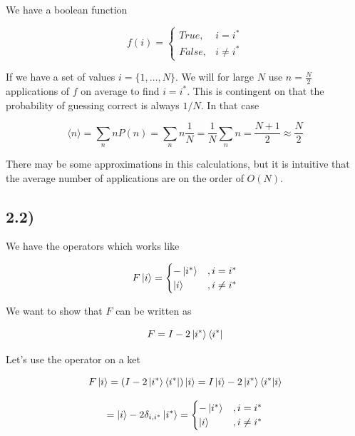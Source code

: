 \documentclass[a4paper,norsk, 10pt]{article}
\begin{document}
We have a boolean function

\begin{equation}
f(i)=
\begin{cases}
True, & i = i^* \\
False, & i \neq i^*
\end{cases}
\end{equation}

If we have a set of values $i = \{1,\ldots, N\}$. We will for large $N$ use $n = \frac{N}{2}$ applications of $f$ on average to find $i = i^*$. This is contingent on that the probability of guessing correct is always $1/N$. In that case

\begin{equation}
\langle n \rangle = \sum_n nP(n) = \sum_n n \frac{1}{N} = \frac{1}{N}\sum_n n = \frac{N+1}{2} \approx \frac{N}{2}
\end{equation}

There may be some approximations in this calculations, but it is intuitive that the average number of applications are on the order of $O(N)$.

\subsection{2.2)}

We have the operators which works like

\begin{equation}
F\ket{i} = 
\begin{cases}
-\ket{i^*} & , i = i^* \\
\ket{i} & , i \neq i^*
\end{cases}
\label{eq:Feffect}
\end{equation}

We want to show that $F$ can be written as

\begin{equation}
F = I - 2\ket{i^*}\bra{i^*}
\label{eq:Foperator}
\end{equation}

Let's use the operator on a ket

\begin{equation}
F\ket{i} = (I - 2\ket{i^*}\bra{i^*})\ket{i} = I\ket{i} - 2\ket{i^*}\bra{i^*}\ket{i}
\end{equation}

\begin{equation}
= \ket{i} - 2\delta_{i,i^*}\ket{i^*} =
\begin{cases}
-\ket{i^*} & , i = i^* \\
\ket{i} & , i \neq i^*
\end{cases}
\end{equation}
\end{document}
